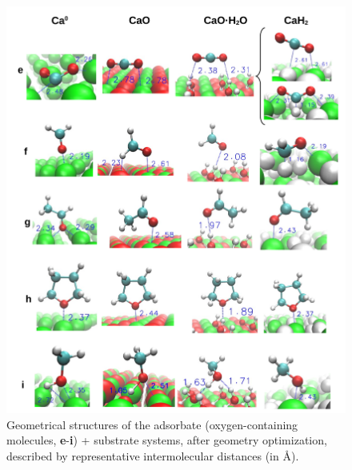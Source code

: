 \documentclass[%
aip,
amsmath,amssymb,
preprint,%
jcp,
showkeys,
]{revtex4-2}
\begin{document}
\begin{figure}[!h]
	\centering
	\includegraphics[width=\linewidth]{Figure9}
	\caption{Geometrical structures of the adsorbate (oxygen-containing molecules, \textbf{e}-\textbf{i}) + substrate systems, after geometry optimization, described by representative intermolecular distances (in \si{\angstrom}).}
	\label{fig:distsei}
\end{figure}
\end{document}

